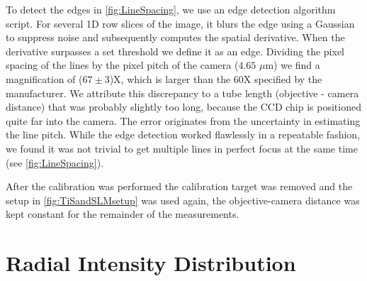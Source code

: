 To detect the edges in \cref{fig:LineSpacing}, we use an edge detection algorithm script.
For several 1D row slices of the image, it blurs the edge using a Gaussian to suppress noise and subsequently computes the spatial derivative. 
When the derivative surpasses a set threshold we define it as an edge.
Dividing the pixel spacing of the lines by the pixel pitch of the camera ($4.65$ $\mu$m) we find a magnification of ($67 \pm 3$)X, which is larger than the 60X specified by the manufacturer. 
We attribute this discrepancy to a tube length (objective - camera distance) that was probably slightly too long, because the CCD chip is positioned quite far into the camera. 
The error originates from the uncertainty in estimating the line pitch.
While the edge detection worked flawlessly in a repeatable fashion, we found it was not trivial to get multiple lines in perfect focus at the same time (see \cref{fig:LineSpacing}).

After the calibration was performed the calibration target was removed and the setup in \cref{fig:TiSandSLMsetup} was used again, the objective-camera distance was kept constant for the remainder of the measurements.

\section{Radial Intensity Distribution}\label{sec:TweezerRadial}

